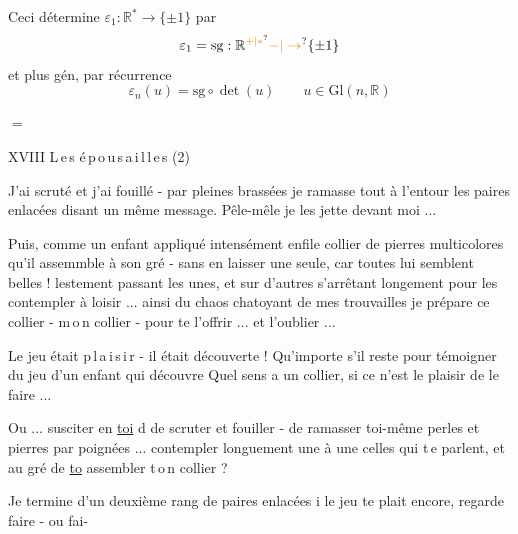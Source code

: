 Ceci détermine $\varepsilon_1:\mathbb R^*\longrightarrow\{\pm1\}$ par
\[
\varepsilon_1=\mathrm{sg}:\mathbb R^{\unsure{+|*}}\unsure{-|\to}\{\pm1\}
\]
et  plus gén, par récurrence
\[
\varepsilon_n(u)=\mathrm{sg}\circ\det(u)\qquad u\in\mathrm{Gl}(n,\mathbb R)
\]

\qquad $=$

XVIII \quad L\,e\,s \quad é\,p\,o\,u\,s\,a\,i\,l\,l\,e\,s \qquad (2)

J'ai scruté et j'ai fouillé - par pleines brassées je ramasse tout à l'entour les paires enlacées disant un même message. Pêle-mêle je les jette devant moi ...

Puis, comme un enfant appliqué intensément enfile collier de pierres multicolores qu'il assemmble à son gré - sans en laisser une seule, car toutes lui semblent belles ! lestement passant les unes, et sur d'autres s'arrêtant longement pour les contempler à loisir ... ainsi du chaos chatoyant de mes trouvailles je prépare ce collier - m\,o\,n collier - pour te l'offrir ... et  l'oublier ...

Le jeu était p\,l\,a\,i\,s\,i\,r - il était découverte ! Qu'importe s'il reste  pour témoigner du jeu  d'un enfant qui découvre  Quel sens a un collier, si ce n'est le plaisir de le faire ...

Ou ... susciter en \uline{toi} d de scruter et fouiller - de ramasser toi-même perles et pierres par poignées ... contempler longuement une à une celles qui t\,e parlent, et au gré de  \uline{to}   assembler t\,o\,n collier ?\margin{\handwritten{[}}


\margin{\handwritten{[}}Je termine d'un deuxième rang de paires enlacées i le jeu te plait encore,  regarde faire - ou  fai- 

